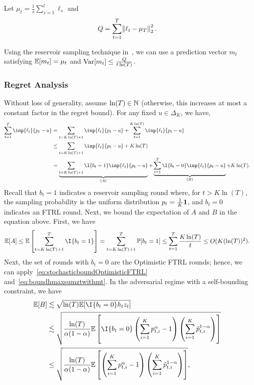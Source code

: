 Let $\mu_t = \frac{1}{s}\sum_{s=1}^{t}\ell_s$ and 
\begin{align*}
    Q = \sum_{t=1}^T \norm{\ell_t - \mu_T}_2^2.
\end{align*}

Using the reservoir sampling technique in~\cite{HazanAndKale11a}, we can use a prediction vector $m_t$ satisfying $\mathbb{E}[m_t] = \mu_t$ and $\mathrm{Var}[m_t] \leq \frac{Q}{t\ln(T)}$.

\subsubsection*{Regret Analysis}
Without loss of generality, assume $\ln(T) \in {\mathbb{N}}$ (otherwise, this increases at most a constant factor in the regret bound).
For any fixed $u \in \Delta_K$, we have,
\begin{align}
    \sum_{t=1}^T \inp{\ell_t}{p_t - u} &= \sum_{t = K\ln(T) + 1}\inp{\ell_t}{p_t - u} + \sum_{t=1}^{K\ln(T)} \inp{\ell_t}{p_t - u} \\
    &\leq \sum_{t = K\ln(T) + 1}\inp{\ell_t}{p_t - u} + K\ln(T) \\
    &= \underbrace{ \sum_{t = K\ln(T) + 1}\I{b_t = 1}\inp{\ell_t}{p_t - u} }_{(A)} + \underbrace{ \sum_{t=1}^T \I{b_t = 0}\inp{\ell_t}{p_t - u} }_{(B)} + K\ln(T).
\end{align}
Recall that $b_t = 1$ indicates a reservoir sampling round where, for $t > K\ln(T)$, the sampling probability is the uniform distribution $p_t = \frac{1}{K}\bm{1}$, and $b_t = 0$ indicates an FTRL round. Next, we bound the expectation of $A$ and $B$ in the equation above. 
First, we have
\begin{align}
    \E[A] \leq \E\left[\sum_{t=K\ln(T)+1}^T \I{b_t = 1}\right] = \sum_{t=K\ln(T)+1}^T \P[b_t = 1] \leq \sum_{t=1}^T \frac{K\ln(T)}{t} \leq O(K(\ln(T))^2).
\end{align}
Next, the set of rounds with $b_t = 0$ are the Optimistic FTRL rounds; hence, we can apply~\eqref{eq:stochasticboundOptimisticFTRL} and~\eqref{eq:boundhmaxsumztwithmt}. 
In the adversarial regime with a self-bounding constraint, we have
\begin{align*}
    \E[B] &\lesssim \sqrt{\ln(T) \E[\I{b_t = 0}h_t z_t]} \\
    &\lesssim \sqrt{\frac{\ln(T)}{\alpha (1-\alpha)} \E\left[\I{b_t = 0} \left(\sum_{i=1}^K p_{t,i}^\alpha - 1\right)\left(\sum_{i=1}^K \tilde{p}_{t,i}^{1-\alpha}\right)\right]} \\
    &\leq  \sqrt{\frac{\ln(T)}{\alpha (1-\alpha)} \E\left[\left(\sum_{i=1}^K p_{t,i}^\alpha - 1\right)\left(\sum_{i=1}^K \tilde{p}_{t,i}^{1-\alpha}\right)\right]},
\end{align*}
